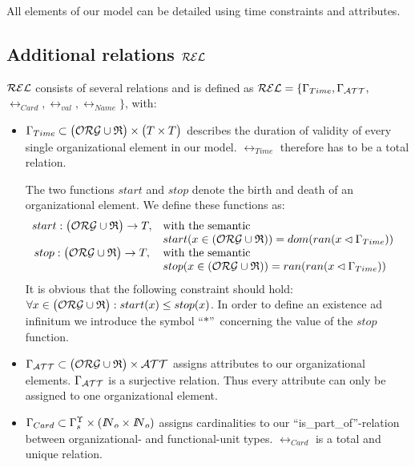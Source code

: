 	All elements of our model can be detailed using time constraints and attributes. 

\subsection{Additional relations $\mathcal{REL}$}

	$\mathcal{REL}$ consists of several relations and is defined as $\mathcal{REL} =\{ \Gamma_{Time}, \Gamma_{\mathcal{ATT}},$ $\rel_{Card}, \rel_{val}, \rel_{Name}\}$, with: 

	\begin{itemize}
	\item $\Gamma_{Time} \subset \bigl( \mathcal{ORG} \cup \mathfrak{R} \bigr)\times \bigl( T \times T \bigr)$ describes the duration of validity of every single organizational element in our model. $\rel_{Time}$ therefore has to be a total relation. 
		
The two functions $start$ and $stop$ denote the birth and death of an organizational element. We define these functions as:
			$$ 
			\begin{array}{cll}
			start: \bigl( \mathcal{ORG} \cup \mathfrak{R} \bigr) \rightarrow T, & 
				\mbox{with the semantic} & \\ 
				& start(x \in ( \mathcal{ORG} \cup \mathfrak{R} ) ) = 
				dom( ran ( x \lhd \Gamma_{Time})) & \\
			stop: \bigl( \mathcal{ORG} \cup \mathfrak{R} \bigr) \rightarrow T, & 
				\mbox{with the semantic} & \\
				& stop(x \in ( \mathcal{ORG} \cup \mathfrak{R} ) ) = 
				ran( ran ( x \lhd \Gamma_{Time})) & \\
			\end{array}
			$$
It is obvious that the following constraint should hold: $\forall x \in \bigl( \mathcal{ORG} \cup \mathfrak{R} \bigr): start(x) \leq stop(x)$.  In order to define an existence ad infinitum we introduce the symbol ``$*$''\ concerning the value of the $stop$ function. 

	\item $\Gamma_{\mathcal{ATT}} \subset \bigl( \mathcal{ORG} \cup \mathfrak{R} \bigr) \times \mathcal{ATT}$ assigns attributes to our organizational elements. 
		$\Gamma_{\mathcal{ATT}}$ is a surjective relation. Thus every attribute can only be assigned to one organizational element. 

	\item $\Gamma_{Card} \subset {\Gamma}^{\Upsilon}_{s} \times ({ I\!\!N}_{o} \times { I\!\!N}_{o})$ assigns cardinalities to our ``is\_part\_of''-relation between organizational- and functional-unit types. $\rel_{Card}$ is a total and unique relation. 
		

\end{itemize}
